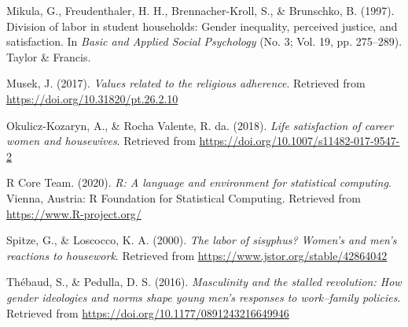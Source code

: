 \documentclass[
  english,
  man]{apa6}
\begin{document}
\leavevmode\hypertarget{ref-mikula_1997}{}%
Mikula, G., Freudenthaler, H. H., Brennacher-Kroll, S., \& Brunschko, B. (1997). Division of labor in student households: Gender inequality, perceived justice, and satisfaction. In \emph{Basic and Applied Social Psychology} (No. 3; Vol. 19, pp. 275--289). Taylor \& Francis.

\leavevmode\hypertarget{ref-musek_2017}{}%
Musek, J. (2017). \emph{Values related to the religious adherence}. Retrieved from \url{https://doi.org/10.31820/pt.26.2.10}

\leavevmode\hypertarget{ref-okulicz_valente_2018}{}%
Okulicz-Kozaryn, A., \& Rocha Valente, R. da. (2018). \emph{Life satisfaction of career women and housewives}. Retrieved from \url{https://doi.org/10.1007/s11482-017-9547-2}

\leavevmode\hypertarget{ref-R-base}{}%
R Core Team. (2020). \emph{R: A language and environment for statistical computing}. Vienna, Austria: R Foundation for Statistical Computing. Retrieved from \url{https://www.R-project.org/}

\leavevmode\hypertarget{ref-spitze_loscocco_2000}{}%
Spitze, G., \& Loscocco, K. A. (2000). \emph{The labor of sisyphus? Women's and men's reactions to housework}. Retrieved from \url{https://www.jstor.org/stable/42864042}

\leavevmode\hypertarget{ref-thebaud_pedulla_2016}{}%
Thébaud, S., \& Pedulla, D. S. (2016). \emph{Masculinity and the stalled revolution: How gender ideologies and norms shape young men's responses to work--family policies}. Retrieved from \url{https://doi.org/10.1177/0891243216649946}
\end{document}

